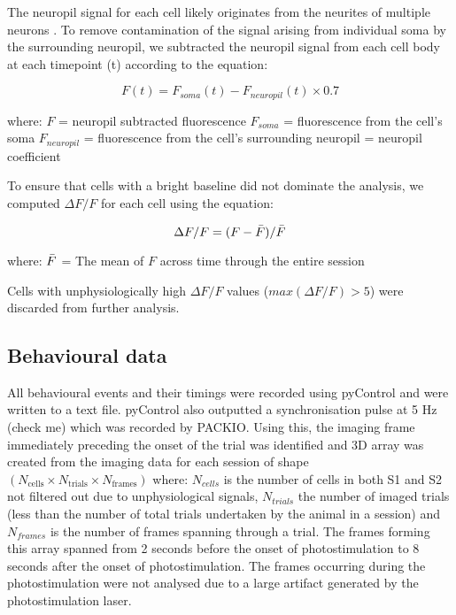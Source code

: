 The neuropil signal for each cell likely originates from the neurites of multiple neurons \cite{chen_ultrasensitive_2013}. To remove contamination of the signal arising from individual soma by the surrounding neuropil, we subtracted the neuropil signal from each cell body at each timepoint (t) according to the equation:

\begin{equation} \label{eq:neuropil_sub}
F(t) = F_{soma}(t) - F_{neuropil}(t) \times 0.7
\end{equation}

where: \newline
$F$ = neuropil subtracted fluorescence \newline
$F_{soma}$ = fluorescence from the cell's soma \newline
$F_{neuropil}$ = fluorescence from the cell's surrounding neuropil  = neuropil coefficient \cite{chen_ultrasensitive_2013} \newline

To ensure that cells with a bright baseline did not dominate the analysis, we computed $\Delta F/F$ for each cell using the equation:

\begin{equation} \label{eq:dff}
\Delta F/F = (F  - \Bar{F}) / \Bar{F}
\end{equation}

where: \newline
$\Bar{F}$ = The mean of $F$ across time through the entire session

Cells with unphysiologically high $\Delta F/F$ values ($max(\Delta F / F) > 5 $) were discarded from further analysis.

\subsection{Behavioural data}

All behavioural events and their timings were recorded using pyControl and were written to a text file. pyControl also outputted a synchronisation pulse at 5 Hz (check me) which was recorded by PACKIO. Using this, the imaging frame immediately preceding the onset of the trial was identified and 3D array was created from the imaging data for each session of shape $(N_{\text{cells}} \times N_{\text{trials}} \times N_{\text{frames}} )$ where: $N_{cells}$ is the number of cells in both S1 and S2 not filtered out due to unphysiological signals, $N_{trials}$ the number of imaged trials (less than the number of total trials undertaken by the animal in a session) and $N_{frames}$ is the number of frames spanning through a trial. The frames forming this array spanned from 2 seconds before the onset of photostimulation to 8 seconds after the onset of photostimulation. The frames occurring during the photostimulation were not analysed due to a large artifact generated by the photostimulation laser. 

